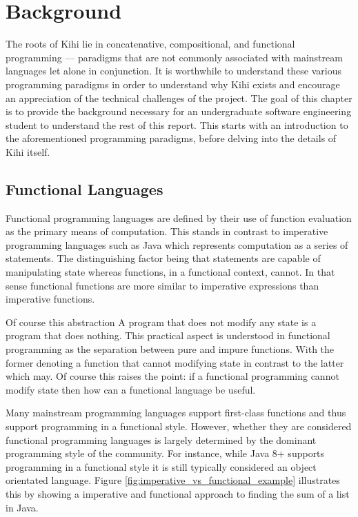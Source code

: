 \chapter{Background} \label{C:background}
The roots of Kihi lie in concatenative, compositional, and functional programming --- paradigms that are not commonly associated with mainstream languages let alone in conjunction. It is worthwhile to understand these various programming paradigms in order to understand why Kihi exists and encourage an appreciation of the technical challenges of the project. The goal of this chapter is to provide the background necessary for an undergraduate software engineering student
to understand the rest of this report. This starts with an introduction to the aforementioned programming paradigms, before delving into the details of Kihi itself.

\section{Functional Languages}

Functional programming languages are defined by their use
of function evaluation as the primary means of computation.
This stands in contrast to imperative programming languages
such as Java which represents computation as a series of 
statements. The distinguishing factor being that statements
are capable of manipulating state whereas functions,
in a functional context, cannot.
In that sense functional functions are more similar to imperative
expressions than imperative functions.

Of course this abstraction
A program that does not modify any state is a program that does nothing. This practical aspect is understood in functional programming as the separation between pure and impure functions. With the former denoting a function that cannot modifying state in contrast to the latter which may.
Of course this raises the point: if a functional programming cannot modify state then how can a functional language be useful.

Many mainstream programming languages support first-class functions and thus support programming in a functional style. However, whether they are considered functional programming languages is largely determined by the dominant programming style of the community. For instance, while Java 8+ supports programming in a functional style it is still typically considered an object orientated language. Figure
\ref{fig:imperative_vs_functional_example} illustrates this by showing a imperative and functional approach to finding the sum
of a list in Java.


